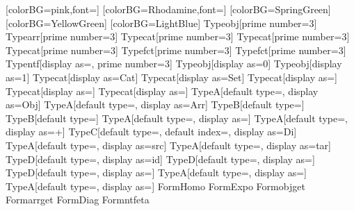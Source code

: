 [colorBG=pink,font=\sf]
[colorBG=Rhodamine,font=\sf]
[colorBG=SpringGreen]
[colorBG=YellowGreen]
[colorBG=LightBlue]
Type{obj}[prime number=3]
Type{arr}[prime number=3]
Type{cat}[prime number=3]
Type{cat}[prime number=3]
Type{cat}[prime number=3]
Type{fct}[prime number=3]
Type{fct}[prime number=3]
Type{ntf}[display as=\eta, prime number=3]
Type{obj}[display as=0]
Type{obj}[display as=1]
Type{cat}[display as=Cat]
Type{cat}[display as=Set]
Type{cat}[display as=]
Type{cat}[display as=]
Type{cat}[display as=]
TypeA[default type=\catCat, display as={\rm Obj}]
TypeA[default type=\catCat, display as={\rm Arr}]
TypeB[default type=\catC]                                         %
TypeB[default type=\catC]                                         %
TypeA[default type=\catC, display as=\times]                      %
TypeA[default type=\catC, display as=+]                           %
TypeC[default type=\catC, default index=\catI, display as={\rm Di}]          %
TypeA[default type=\catC, display as={{\rm src}}]               %
TypeA[default type=\catC, display as={{\rm tar}}]               %
TypeD[default type=\objc, display as={{\rm id}}]                  %
TypeD[default type=\objc, display as={\text{!}}]                  %
TypeD[default type=\objc, display as={\text{\textexclamdown}}]    %
TypeA[default type=\catC, display as={}]                 %
TypeA[default type=\catC, display as={}]          %
% 
Form{Homo}
Form{Expo}
\RegistOprEvalTypeU{}Form{objget}
\RegistOprEvalTypeU{}Form{arrget}
\RegistOprEvalTypeU{}Form{Diag}
Form{ntfeta}

